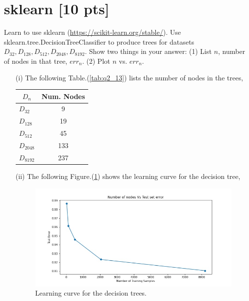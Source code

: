 \documentclass[a4paper]{article}
\theoremstyle{definition}
\newenvironment{soln}{
    \leavevmode\color{blue}\ignorespaces
}{}
\begin{document}
\section{sklearn [10 pts]}
Learn to use sklearn (\url{https://scikit-learn.org/stable/}).
Use sklearn.tree.DecisionTreeClassifier to produce trees for datasets $D_{32}, D_{128}, D_{512}, D_{2048}, D_{8192}$.  Show two things in your answer: (1) List $n$, number of nodes in that tree, $err_n$. (2) Plot $n$ vs. $err_n$.
\\
\begin{soln}
  \begin{itemize}
    \item [(i)] The following Table.(\ref{tab:q2_13}) lists the number of nodes in the trees,
    \begin{table}[H]
      \centering
      \begin{tabular}{|l|c|}
      \hline
      \multicolumn{1}{|c|}{$D_n$} & \textbf{Num. Nodes} \\ \hline
      $D_{32}$                               & 9                   \\ \hline
      $D_{128}$                               & 19                   \\ \hline
      $D_{512}$                               & 45                   \\ \hline
      $D_{2048}$                               & 133                  \\ \hline
      $D_{8192}$                               & 237                   \\ \hline
      \end{tabular}
      \end{table}
      \label{tab:q2_13}


    \item [(ii)] The following Figure.(\ref{fig:q2_14}) shows the learning curve for the decision tree,
    \begin{figure}[H]
      \centering
      \includegraphics[width=12cm]{q3_nodes_v_err.jpg}
      \caption{Learning curve for the decision trees.}
      \label{fig:q2_14}
    \end{figure}

  \end{itemize}

\end{soln}
\end{document}
